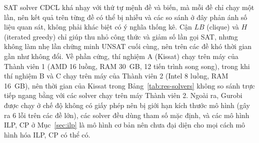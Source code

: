 SAT solver CDCL khá nhạy với thứ tự mệnh đề và biến, mà mỗi đề chỉ chạy một lần, nên kết quả trên từng đề có thể bị nhiễu và các so sánh ở đây phản ánh số liệu quan sát, không phải khác biệt có ý nghĩa thống kê. Cận $LB$ (clique) và $H$ (iterated greedy) chỉ giúp thu nhỏ công thức và giảm số lần gọi SAT, nhưng không làm nhẹ lần chứng minh UNSAT cuối cùng, nên trên các đề khó thời gian gần như không đổi. Về phần cứng, thí nghiệm A (Kissat) chạy trên máy của Thành viên 1 (AMD 16 luồng, RAM 30~GB, 12 tiến trình song song), trong khi thí nghiệm B và C chạy trên máy của Thành viên 2 (Intel 8 luồng, RAM 16~GB), nên thời gian của Kissat trong Bảng~\ref{tab:res-solvers} không so sánh trực tiếp ngang bằng với các solver chạy trên máy Thành viên 2. Ngoài ra, Gurobi được chạy ở chế độ không có giấy phép nên bị giới hạn kích thước mô hình (gây ra 6 lỗi trên các đề lớn), các solver đều dùng tham số mặc định, và các mô hình ILP, CP ở Mục~\ref{sec:ilp} là mô hình cơ bản nên chưa đại diện cho mọi cách mô hình hóa ILP, CP có thể có.
